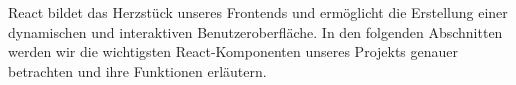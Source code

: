 React bildet das Herzstück unseres Frontends und ermöglicht die Erstellung einer dynamischen und interaktiven Benutzeroberfläche. In den folgenden Abschnitten werden wir die wichtigsten React-Komponenten unseres Projekts genauer betrachten und ihre Funktionen erläutern.